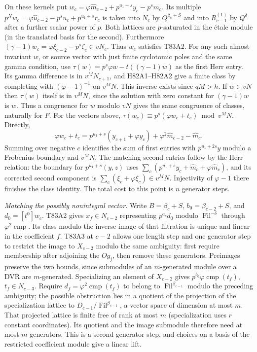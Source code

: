 On these kernels put
$w_c=\varphi\widehat m_{c-2}+p^{u_1+s}y_c-p^sm_c$.
Its multiple $p^Nw_c=\varphi\widehat u_{c-2}-p^su_c+
p^{u_1+s}r_c$ is taken into $N_c$ by $Q^{\beta_c+S}$ and into
$R_{c-1}^{(1)}$ by $Q^\delta$ after a further scalar power of
$p$. Both lattices are $p$-saturated in the \'etale module (in
the translated basis for the second). Furthermore
$(\gamma-1)w_c=\varphi\xi_{c-2}-p^s\zeta_c\in vN_c$.
Thus $w_c$ satisfies T83A2. For any such almost invariant $w$,
or source vector with just finite cyclotomic poles and the same
gamma condition, use
$\tau(w)=p^s\varphi w-t((\gamma-1)w)$ as the first Herr entry.
Its gamma difference is in $v^MN_{c+1}$, and H82A1--H82A2
give a finite class by completing with $(\varphi-1)^{-1}$ on
$v^MN$. This inverse exists since $qM>h$. If $w\in vN$ then
$\tau(w)$ itself is in $v^MN$, since the solution with zero
constant for $(\gamma-1)w$ is $w$. Thus a congruence for $w$
modulo $vN$ gives the same congruence of classes, naturally for
$F$. For the vectors above, $\tau(w_c)\equiv
p^s(\varphi w_c+t_c)\bmod v^MN$. Directly,
\[
 \varphi w_c+t_c
 =p^{u_1+s}(y_{c+1}+\varphi y_c)
      +\varphi^2\widehat m_{c-2}-\widehat m_c.
\]
Summing over negative $c$ identifies the sum of first entries
with $p^{u_1+2s}y$ modulo a Frobenius boundary and $v^MN$.
The matching second entries follow by the Herr relation:
the boundary for $p^{u_1+s}(y,z)$ uses
$\sum_c(p^{u_1+s}y_c+\widehat m_c+\varphi\widehat m_c)$,
and its corrected second component is
$\sum_c(\xi_c+\varphi\xi_c)\in v^MN$. Injectivity of
$\varphi-1$ there finishes the class identity.
The total cost to this point is $n$ generator steps.

\emph{Matching the possibly nonintegral vector.}
Write $B=\beta_c+S$, $b_0=\beta_{c-2}+S$, and
$d_0=[t^0]w_c$. T83A2 gives $x_f\in N_{c-2}$ representing
$p^{a_c}d_0$ modulo $\operatorname{Fil}^{-\delta}$ through
$\varphi^2\operatorname{cmp}$. Its class modulo the inverse
image of that filtration is unique and linear in the coefficient
$f$. T83A3 at $c-2$ allows one length step and one generator
step to restrict the image to $X_{c-2}$ modulo the same ambiguity:
first require membership after adjoining the $Og_j$, then remove
these generators. Preimages preserve the two bounds, since
submodules of an $m$-generated module over a DVR are
$m$-generated. Specializing an element of $X_{c-2}$ gives
$p^{b_0}\varphi\operatorname{cmp}(t_f)$,
$t_f\in N_{c-3}$. Require $d_f=\varphi^2\operatorname{cmp}(t_f)$
to belong to $\operatorname{Fil}^{\beta_{c-1}}$ modulo the preceding
ambiguity; the possible obstruction lies in a quotient of the
projection of the specialization lattice to
$D_{c-1}/\operatorname{Fil}^{\beta_{c-1}}$, a vector space
of dimension at most $m$. That projected lattice is finite free
of rank at most $m$ (specialization uses $r$ constant coordinates).
Its quotient and the image submodule therefore need at most
$m$ generators. This is a second generator step, and choices on a basis of the
restricted coefficient module give a linear lift.

